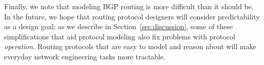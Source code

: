 Finally, we note that modeling BGP routing is more difficult than
it should be.  In the future, we hope that routing protocol designers
will consider predictability as a design goal; as we describe in
Section~\ref{sec:discussion}, some of these simplifications that aid
protocol modeling also fix problems with protocol {\em operation}.
Routing protocols that are easy to model and reason about will make
everyday network engineering tasks more tractable.




